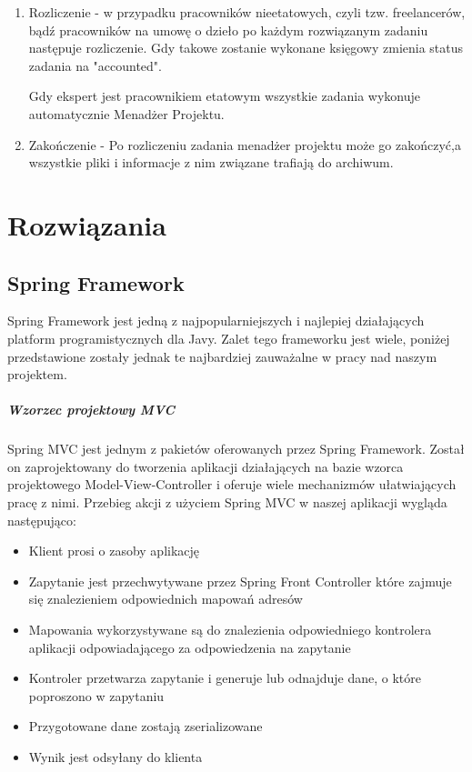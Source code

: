 \documentclass[licencjacka]{pracamgr}
\begin{document}
\begin{enumerate}
\item Rozliczenie - w przypadku pracowników nieetatowych, czyli tzw. freelancerów, bądź pracowników na umowę o dzieło po każdym rozwiązanym zadaniu następuje rozliczenie. Gdy takowe zostanie wykonane księgowy zmienia status zadania na "accounted".

Gdy ekspert jest pracownikiem etatowym wszystkie zadania wykonuje automatycznie Menadżer Projektu.
\item Zakończenie - Po rozliczeniu zadania menadżer projektu może go zakończyć,a wszystkie pliki i informacje z nim związane trafiają do archiwum. 
\end{enumerate}

\chapter{Rozwiązania}
\section{Spring Framework}
Spring Framework jest jedną z najpopularniejszych i najlepiej działających platform programistycznych dla Javy. Zalet tego frameworku jest wiele, poniżej przedstawione zostały jednak te najbardziej zauważalne w pracy nad naszym projektem.

\paragraph{Wzorzec projektowy MVC}
Spring MVC jest jednym z pakietów oferowanych przez Spring Framework. Został on zaprojektowany do tworzenia aplikacji działających na bazie wzorca projektowego Model-View-Controller i oferuje wiele mechanizmów ułatwiających pracę z nimi. Przebieg akcji z użyciem Spring MVC w naszej aplikacji wygląda następująco:

\begin{itemize}
  \item Klient prosi o zasoby aplikację
  \item Zapytanie jest przechwytywane przez Spring Front Controller które zajmuje się znalezieniem odpowiednich mapowań adresów
  \item Mapowania wykorzystywane są do znalezienia odpowiedniego kontrolera aplikacji odpowiadającego za odpowiedzenia na zapytanie
  \item Kontroler przetwarza zapytanie i generuje lub odnajduje dane, o które poproszono w zapytaniu
  \item Przygotowane dane zostają zserializowane
  \item Wynik jest odsyłany do klienta
\end{itemize}
\end{document}
